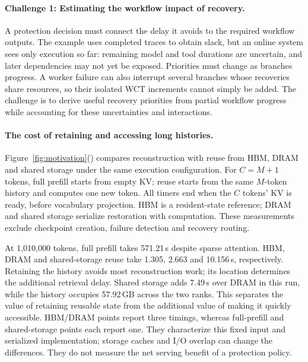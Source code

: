 \paragraph{Challenge 1: Estimating the workflow impact of recovery.}
A protection decision must connect the delay it avoids to the required
workflow outputs. The example uses completed traces to obtain slack,
but an online system sees only execution so far: remaining model and
tool durations are uncertain, and later dependencies may not yet be
exposed. Priorities must change as branches progress. A worker failure
can also interrupt several branches whose recoveries share resources,
so their isolated WCT increments cannot simply be added. The challenge
is to derive useful recovery priorities from partial workflow progress
while accounting for these uncertainties and interactions.

\paragraph{The cost of retaining and accessing long histories.}
\label{sec:motivation-long-context}
Figure~\ref{fig:motivation}() compares
reconstruction with reuse from HBM, DRAM and shared storage under the
same execution configuration. For $C=M+1$ tokens, full prefill starts
from empty KV; reuse starts from the same $M$-token history and computes
one new token. All timers end when the $C$ tokens' KV is ready, before
vocabulary projection. HBM is a resident-state reference; DRAM and shared
storage serialize restoration with computation. These measurements
exclude checkpoint creation, failure detection and recovery routing.

At 1,010,000 tokens, full prefill takes 571.21\,s despite sparse attention.
HBM, DRAM and shared-storage reuse take 1.305, 2.663 and 10.156\,s,
respectively. Retaining the history avoids most reconstruction work;
its location determines the additional retrieval delay. Shared storage
adds 7.49\,s over DRAM in this run, while the history occupies 57.92\,GB
across the two ranks. This separates the value of retaining reusable
state from the additional value of making it quickly accessible.
HBM/DRAM points report three timings, whereas full-prefill and
shared-storage points each report one. They characterize this fixed
input and serialized implementation; storage caches and I/O overlap can
change the differences. They do not measure the net serving benefit
of a protection policy.

